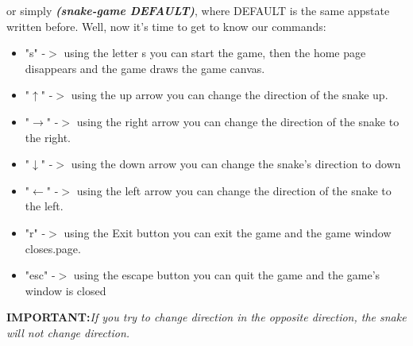 \documentclass{article}
\begin{document}
	or simply \textbf{\emph{(snake-game DEFAULT)}}, where DEFAULT is the same appstate written before.
	\newpage
	Well, now it's time to get to know our commands:
	
	\begin{itemize}
		\item "s" -$>$ using the letter s you can start the game, then the home page disappears and the game draws the game canvas.
		\item "$\uparrow$" -$>$ using the up arrow you can change the direction of the snake up.
		\item "$\rightarrow$" -$>$ using the right arrow you can change the direction of the snake to the right.
		\item "$\downarrow$" -$>$ using the down arrow you can change the snake's direction to down
		\item "$\leftarrow$" -$>$ using the left arrow you can change the direction of the snake to the left.
		\item "r" -$>$ using the Exit button you can exit the game and the game window closes.page.
		\item "esc" -$>$ using the escape button you can quit the game and the game's window is closed
	\end{itemize}
	
	\large{\textbf{IMPORTANT:}}\emph{If you try to change direction in the opposite direction, the snake will not change direction.}
\end{document}
